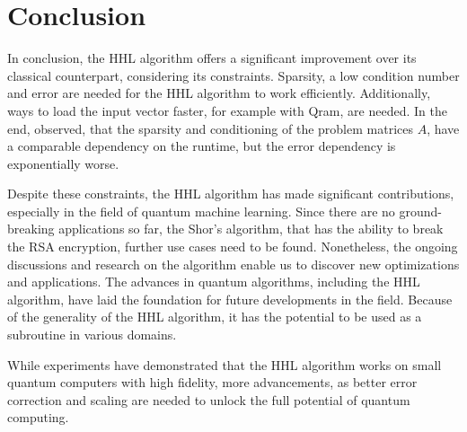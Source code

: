 \section{Conclusion}

In conclusion, the HHL algorithm offers a significant improvement over its classical counterpart, considering its constraints.
Sparsity, a low condition number and error are needed for the HHL algorithm to work efficiently.
Additionally, ways to load the input vector faster, for example with Qram, are needed. 
In the end, observed, that the sparsity and conditioning of the problem matrices $A$, have a comparable dependency on the runtime, but the error dependency is exponentially worse. 


Despite these constraints, the HHL algorithm has made significant contributions, especially in the field of quantum machine learning. 
Since there are no ground-breaking applications so far, the Shor's algorithm, that has the ability to break the RSA encryption, further use cases need to be found.
Nonetheless, the ongoing discussions and research on the algorithm enable us to discover new optimizations and applications.
The advances in quantum algorithms, including the HHL algorithm, have laid the foundation for future developments in the field.
Because of the generality of the HHL algorithm, it has the potential to be used as a subroutine in various domains.

While experiments have demonstrated that the HHL algorithm works on small quantum computers with high fidelity, 
more advancements, as better error correction and scaling are needed to unlock the full potential of quantum computing.



